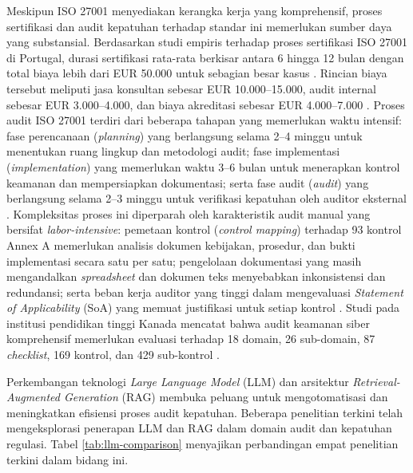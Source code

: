 \documentclass[bachelor,bahasa]{thesisdtetiugm}
\begin{document}
Meskipun ISO 27001 menyediakan kerangka kerja yang komprehensif, proses sertifikasi dan audit kepatuhan terhadap standar ini memerlukan sumber daya yang substansial. Berdasarkan studi empiris terhadap proses sertifikasi ISO 27001 di Portugal, durasi sertifikasi rata-rata berkisar antara 6 hingga 12 bulan dengan total biaya lebih dari EUR 50.000 untuk sebagian besar kasus \cite{automatingiso27001}. Rincian biaya tersebut meliputi jasa konsultan sebesar EUR 10.000--15.000, audit internal sebesar EUR 3.000--4.000, dan biaya akreditasi sebesar EUR 4.000--7.000 \cite{automatingiso27001}. Proses audit ISO 27001 terdiri dari beberapa tahapan yang memerlukan waktu intensif: fase perencanaan (\textit{planning}) yang berlangsung selama 2--4 minggu untuk menentukan ruang lingkup dan metodologi audit; fase implementasi (\textit{implementation}) yang memerlukan waktu 3--6 bulan untuk menerapkan kontrol keamanan dan mempersiapkan dokumentasi; serta fase audit (\textit{audit}) yang berlangsung selama 2--3 minggu untuk verifikasi kepatuhan oleh auditor eksternal \cite{automatingiso27001}. Kompleksitas proses ini diperparah oleh karakteristik audit manual yang bersifat \textit{labor-intensive}: pemetaan kontrol (\textit{control mapping}) terhadap 93 kontrol Annex A memerlukan analisis dokumen kebijakan, prosedur, dan bukti implementasi secara satu per satu; pengelolaan dokumentasi yang masih mengandalkan \textit{spreadsheet} dan dokumen teks menyebabkan inkonsistensi dan redundansi; serta beban kerja auditor yang tinggi dalam mengevaluasi \textit{Statement of Applicability} (SoA) yang memuat justifikasi untuk setiap kontrol \cite{csam2024, csam2validation2024}. Studi pada institusi pendidikan tinggi Kanada mencatat bahwa audit keamanan siber komprehensif memerlukan evaluasi terhadap 18 domain, 26 sub-domain, 87 \textit{checklist}, 169 kontrol, dan 429 sub-kontrol \cite{csam2024}.

Perkembangan teknologi \textit{Large Language Model} (LLM) dan arsitektur \textit{Retrieval-Augmented Generation} (RAG) membuka peluang untuk mengotomatisasi dan meningkatkan efisiensi proses audit kepatuhan. Beberapa penelitian terkini telah mengeksplorasi penerapan LLM dan RAG dalam domain audit dan kepatuhan regulasi. Tabel \ref{tab:llm-comparison} menyajikan perbandingan empat penelitian terkini dalam bidang ini.
\end{document}
